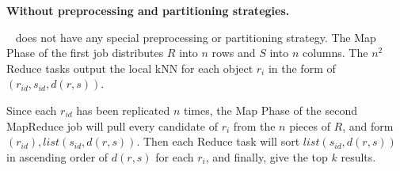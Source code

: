 
\vspace{0.3em}

\noindent \textbf{Without preprocessing and partitioning strategies.} 

\noindent \HBNLJ~ does not have any special preprocessing or partitioning strategy. The Map Phase of the first job distributes $R$ into $n$ rows and $S$ into $n$ columns. The $n^2$ Reduce tasks output the local kNN for each object $r_i$ in the form of $(r_{id}, s_{id}, d(r, s))$.

Since each $r_{id}$ has been replicated $n$ times, the Map Phase of the second MapReduce job will pull every candidate of $r_i$ from the $n$ pieces of $R$, and form $(r_{id}), list(s_{id}, d(r, s))$. Then each Reduce task will sort $list(s_{id}, d(r, s))$ in ascending order of $d(r, s)$ for each $r_i$, and finally, give the top $k$ results.

